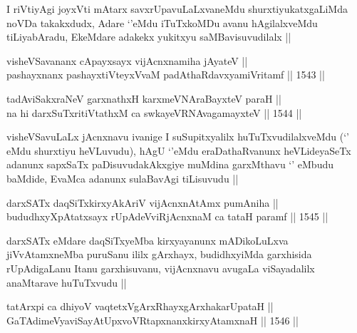 \begin{artha}
I riVtiyAgi joyxVti mAtarx savxrUpavuLaLxvaneMdu shurxtiyukatxgaLiMda noVDa takakxdudx, Adare `\stext'eMdu iTuTxkoMDu avanu hAgilalxveMdu tiLiyabAradu, EkeMdare adakekx yukitxyu saMBavisuvudilalx ||
\end{artha}



\begin{shl}
visheVSavananx cApayxsayx vijAcnxnamiha jAyateV || \\
pashayxnanx pashayxtiVteyxVvaM padAthaRdavxyamiVritamf ||  1543 ||  
\end{shl}
				
\begin{shl}
tadAviSakxraNeV garxnathxH karxmeVNA\s \s raBayxteV paraH || \\
na hi darxSuTxritiVtathxM ca swkayeVRNAvagamayxteV ||  1544 ||  
\end{shl}

\begin{artha}
visheVSavuLaLx jAcnxnavu ivanige I suSupitxyalilx huTuTxvudilalxveMdu (`\stext' eMdu shurxtiyu heVLuvudu), hAgU `\stext'eMdu eraDathaRvanunx heVLideyaSeTx adanunx sapxSaTx paDisuvudakAkxgiye muMdina garxMthavu `\stext' eMbudu baMdide, EvaMca adanunx sulaBavAgi tiLisuvudu ||
\end{artha}


\begin{shl}
darxSATx daqSiTxkirxyAkAriV vijAcnxnAtAmx pumAniha || \\
bududhxyXpAtatxsayx rUpAdeVviRjAcnxnaM ca tataH paramf ||  1545 ||  
\end{shl}

\begin{artha}
darxSATx eMdare daqSiTxyeMba kirxyayanunx mADikoLuLxva jiVvAtamxneMba puruSanu ililx gArxhayx, budidhxyiMda garxhisida rUpAdigaLanu Itanu garxhisuvanu, vijAcnxnavu avugaLa viSayadalilx anaMtarave huTuTxvudu ||
\end{artha}

\begin{shl}
tatArxpi ca dhiyoV vaqtetxVgArxRhayxgArxhakarUpataH || \\
GaTAdimeVyaviSayAtUpxvoVRtapxnanxkirxyAtamxnaH ||  1546 ||  
\end{shl}


